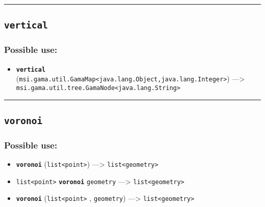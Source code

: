 \documentclass[]{book}
\providecommand{\tightlist}{%
  \setlength{\itemsep}{0pt}\setlength{\parskip}{0pt}}
\theoremstyle{definition}
\theoremstyle{definition}
\theoremstyle{definition}
\theoremstyle{remark}
\begin{document}
\begin{center}\rule{0.5\linewidth}{\linethickness}\end{center}

\subsection{\texorpdfstring{\texttt{vertical}}{vertical}}\label{vertical}

\subsubsection{Possible use:}\label{possible-use-551}

\begin{itemize}
\tightlist
\item
  \textbf{\texttt{vertical}}
  (\texttt{msi.gama.util.GamaMap\textless{}java.lang.Object,java.lang.Integer\textgreater{}})
  ---\textgreater{}
  \texttt{msi.gama.util.tree.GamaNode\textless{}java.lang.String\textgreater{}}
\end{itemize}

\begin{center}\rule{0.5\linewidth}{\linethickness}\end{center}

\subsection{\texorpdfstring{\texttt{voronoi}}{voronoi}}\label{voronoi}

\subsubsection{Possible use:}\label{possible-use-552}

\begin{itemize}
\tightlist
\item
  \textbf{\texttt{voronoi}}
  (\texttt{list\textless{}point\textgreater{}}) ---\textgreater{}
  \texttt{list\textless{}geometry\textgreater{}}
\item
  \texttt{list\textless{}point\textgreater{}} \textbf{\texttt{voronoi}}
  \texttt{geometry} ---\textgreater{}
  \texttt{list\textless{}geometry\textgreater{}}
\item
  \textbf{\texttt{voronoi}} (\texttt{list\textless{}point\textgreater{}}
  , \texttt{geometry}) ---\textgreater{}
  \texttt{list\textless{}geometry\textgreater{}}
\end{itemize}
\end{document}
